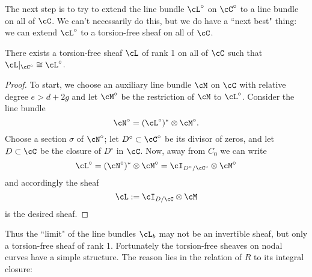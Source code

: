 The next step is to try to extend the line bundle $\cL^\circ$ on $\cC^\circ$ to a line bundle on all of $\cC$. We can't necessarily do this, but we do have a ``next best" thing: we can extend $\cL^\circ$  to a torsion-free sheaf on all of $\cC$.



\begin{lemma}
There exists a torsion-free sheaf $\cL$ of rank 1 on all of $\cC$ such that $\cL|_{\cC^\circ} \cong \cL^\circ$.
\end{lemma}

\begin{proof} To start, we choose an auxiliary line bundle $\cM$ on $\cC$ with relative degree $e > d + 2g$ and let $\cM^\circ$ be the restriction of $\cM$ to $\cL^\circ$. Consider the line bundle 
$$
\cN^\circ = (\cL^\circ)^* \otimes \cM^\circ.
$$
Choose a section $\sigma$ of $\cN^\circ$; let $D^\circ \subset \cC^\circ$ be its divisor of zeros, and let $D \subset \cC$ be the closure of $D^\circ$ in $\cC$. Now, away from $C_0$ we can write
$$
\cL^\circ = (\cN^\circ)^* \otimes \cM^\circ = \cI_{D^\circ/\cC^\circ} \otimes \cM^\circ
$$
and accordingly the sheaf
$$
\cL := \cI_{D/\cC} \otimes \cM
$$
is the desired sheaf. 
\end{proof}

%

Thus the ``limit" of the line bundles $\cL_b$ may not be an invertible sheaf, but only a torsion-free sheaf of rank 1. Fortunately the torsion-free sheaves on nodal curves have a simple structure. The reason lies in the relation of $R$ to its integral closure:

